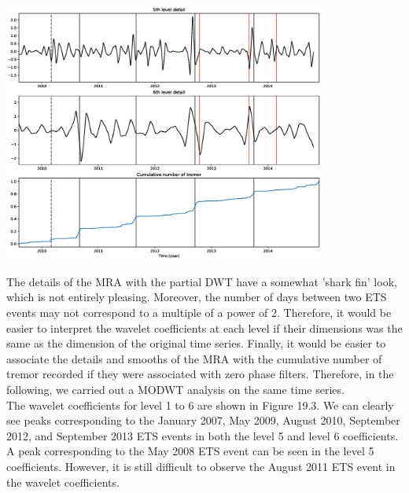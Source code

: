\documentclass[main.tex]{subfiles}
\begin{document}
\begin{center}
\includegraphics[width=300pt]{Figures/slowslip_results/Figure_2.eps}
\captionsetup{type=figure}
\end{center}

The details of the MRA with the partial DWT have a somewhat 'shark fin' look, which is not entirely pleasing. Moreover, the number of days between two ETS events may not correspond to a multiple of a power of 2. Therefore, it would be easier to interpret the wavelet coefficients at each level if their dimensions was the same as the dimension of the original time series. Finally, it would be easier to associate the details and smooths of the MRA with the cumulative number of tremor recorded if they were associated with zero phase filters. Therefore, in the following, we carried out a MODWT analysis on the same time series. \\

The wavelet coefficients for level 1 to 6 are shown in Figure 19.3. We can clearly see peaks corresponding to the January 2007, May 2009, August 2010, September 2012, and September 2013 ETS events in both the level 5 and level 6 coefficients. A peak corresponding to the May 2008 ETS event can be seen in the level 5 coefficients. However, it is still difficult to observe the August 2011 ETS event in the wavelet coefficients. \\
\end{document}
